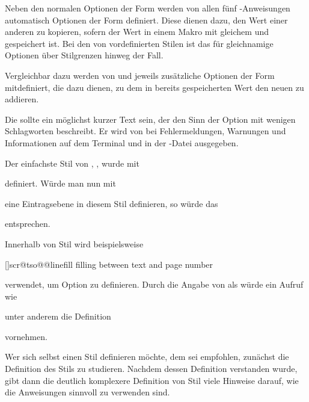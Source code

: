 Neben den normalen Optionen der Form
 werden von allen fünf
-Anweisungen automatisch Optionen der Form
 definiert. Diese dienen
dazu, den Wert einer anderen  zu kopieren, sofern der
Wert in einem Makro mit gleichem  und 
gespeichert ist. Bei den von  vordefinierten Stilen ist das
für gleichnamige Optionen über Stilgrenzen hinweg der Fall.

Vergleichbar dazu werden von  und
 jeweils zusätzliche Optionen der Form
 mitdefiniert, die dazu dienen, zu
dem in  bereits
gespeicherten Wert den neuen  zu addieren.

Die  sollte ein möglichst kurzer Text sein, der den Sinn der
Option mit wenigen Schlagworten beschreibt. Er wird von  bei
Fehlermeldungen, Warnungen und Informationen auf dem Terminal und in der
-Datei ausgegeben.
\begin{Example}
Der einfachste Stil von , , wurde mit
\begin{lstcode}
\end{lstcode}
definiert. Würde man nun mit
\begin{lstcode}
\end{lstcode}
eine Eintragsebene  in diesem Stil definieren, so würde das%
%
\begin{lstcode}
  \def\dummytocdepth{1}
  \def\l@dummy#1#2{}
\end{lstcode}
entsprechen.

Innerhalb von Stil  wird beispielsweise
\begin{lstcode}
    [\TOCLineLeaderFill]{scr@tso@}{@linefill}%
    {filling between text and page number}%
\end{lstcode}
verwendet, um Option  zu definieren. Durch die Angabe von
 als  würde ein
Aufruf wie
\begin{lstcode}
\end{lstcode}
unter anderem die Definition
\begin{lstcode}
  \def\scr@tso@part@linefill{\TOCLineLeaderFill}
\end{lstcode}
vornehmen.
\end{Example}
Wer sich selbst einen Stil definieren möchte, dem sei
empfohlen, zunächst die Definition des Stils  zu
studieren. Nachdem dessen Definition verstanden wurde, gibt dann die deutlich
komplexere Definition von Stil  viele Hinweise darauf, wie die
Anweisungen sinnvoll zu verwenden sind.


